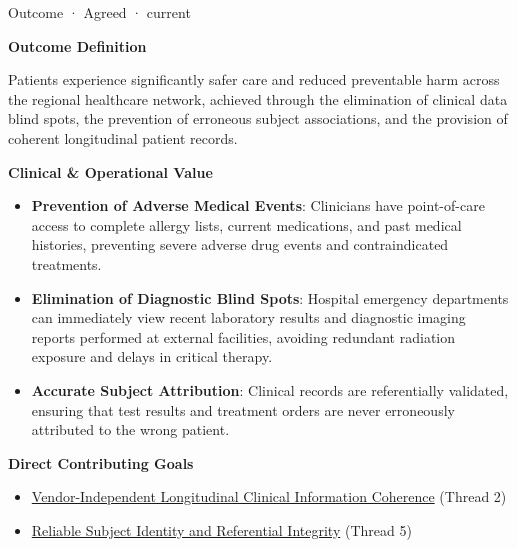 \label{element:0582153fb1f1402b83e5358b61fd60af}
{\small Outcome · Agreed · current}\par

\par\medskip\textbf{Outcome Definition}\par


Patients experience significantly safer care and reduced preventable harm across the regional healthcare network, achieved through the elimination of clinical data blind spots, the prevention of erroneous subject associations, and the provision of coherent longitudinal patient records.



\par\medskip\textbf{Clinical \& Operational Value}\par


\begin{itemize}


\item \textbf{Prevention of Adverse Medical Events}: Clinicians have point-of-care access to complete allergy lists, current medications, and past medical histories, preventing severe adverse drug events and contraindicated treatments.

\item \textbf{Elimination of Diagnostic Blind Spots}: Hospital emergency departments can immediately view recent laboratory results and diagnostic imaging reports performed at external facilities, avoiding redundant radiation exposure and delays in critical therapy.

\item \textbf{Accurate Subject Attribution}: Clinical records are referentially validated, ensuring that test results and treatment orders are never erroneously attributed to the wrong patient.

\end{itemize}


\par\medskip\textbf{Direct Contributing Goals}\par


\begin{itemize}


\item \href{\detokenize{../../../../../docs/markdown/01-motivation/goals-outcomes/strategic-goals.md}}{Vendor-Independent Longitudinal Clinical Information Coherence} (Thread 2)

\item \href{\detokenize{../../../../../docs/markdown/01-motivation/goals-outcomes/strategic-goals.md}}{Reliable Subject Identity and Referential Integrity} (Thread 5)

\end{itemize}

